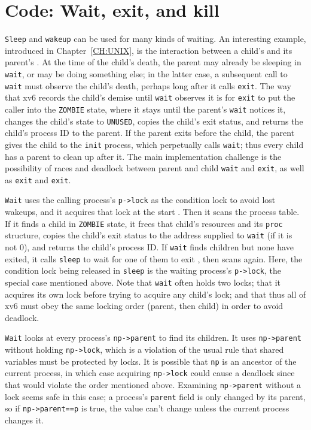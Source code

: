 \section{Code: Wait, exit, and kill}
\lstinline{Sleep}
and
\lstinline{wakeup}
can be used for many kinds of waiting.
An interesting example, introduced in Chapter~\ref{CH:UNIX},
is the interaction between a child's 
and its parent's .
At the time of the child's death, the parent may already
be sleeping in {\tt wait}, or may be doing something else;
in the latter case, a subsequent call to {\tt wait} must
observe the child's death, perhaps long after it calls {\tt exit}.
The way that xv6 records the child's demise until {\tt wait}
observes it is for {\tt exit} to put the caller into the {\tt ZOMBIE}
state, where it stays until the parent's {\tt wait} notices it, changes
the child's state to {\tt UNUSED}, copies the child's exit status,
and returns the child's process ID to the parent.
If the parent exits before the child, the 
parent gives the child to the
\lstinline{init}
process, which perpetually calls {\tt wait};
thus
every child has a parent to clean up after it.
The main implementation challenge is
the possibility of races and deadlock between
parent and child
\lstinline{wait}
and
\lstinline{exit},
as well as
\lstinline{exit}
and
\lstinline{exit}.

\lstinline{Wait}
uses the calling process's
\lstinline{p->lock}
as the condition lock to avoid lost wakeups,
and it acquires that lock at the start
.
Then it scans the process table.
If it finds a child in \texttt{ZOMBIE} state,
it frees that child's resources and
its \lstinline{proc} structure, copies
the child's exit status to the address supplied to \lstinline{wait}
(if it is not 0),
and returns the child's process ID.
If 
\lstinline{wait}
finds children but none have exited,
it calls
\lstinline{sleep}
to wait for one of them to exit
,
then scans again.
Here,
the condition lock being released in 
\lstinline{sleep}
is the waiting process's \lstinline{p->lock},
the special case mentioned above.
Note that \lstinline{wait} often holds two locks;
that it acquires its own lock before trying to acquire
any child's lock;
and that thus all of xv6 must obey the same locking order
(parent, then child) in order to avoid deadlock.

\lstinline{Wait}
looks at every process's \lstinline{np->parent} to find
its children. It uses \lstinline{np->parent} without holding
\lstinline{np->lock}, which is a violation of the usual rule that
shared variables must be protected by locks. It is possible that
\lstinline{np} is an ancestor of the current process, in which case
acquiring \lstinline{np->lock} could cause a deadlock since that would
violate the order mentioned above. Examining \lstinline{np->parent}
without a lock seems safe in this case; a process's \lstinline{parent}
field is only changed by its parent, so if \lstinline{np->parent==p}
is true, the value can't change unless the current process changes it.

